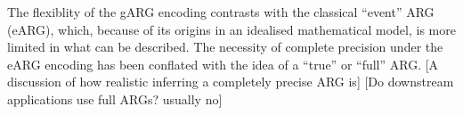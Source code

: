 \documentclass{article}
\newcommand{\kwarg}[0]{\texttt{KwARG}}
\newcommand{\relate}[0]{\texttt{Relate}}
\begin{document}
The flexiblity of the gARG encoding contrasts with the classical
``event'' ARG (eARG), which, because of its origins in an idealised
mathematical model, is more limited in what can be described.
The necessity of complete precision under the eARG encoding has been
conflated with the idea of a ``true'' or ``full'' ARG.
[A discussion of how realistic inferring a completely precise ARG is]
[Do downstream applications use full ARGs? usually no]

\end{document}
